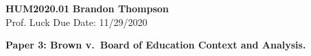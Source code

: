 \noindent
\textbf{HUM2020.01} \hfill \textbf{Brandon Thompson} \\
\normalsize Prof. Luck \hfill Due Date: 11/29/2020 \\

\begin{center}
\textbf{Paper 3: Brown v.\ Board of Education Context and Analysis.}
\end{center}
